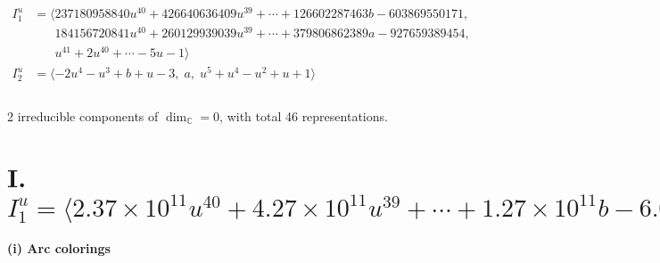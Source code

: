 \documentclass[1p]{elsarticle_modified}
\theoremstyle{definition}
\begin{document}
\begin{align*}
I^u_{1}&=\langle 
237180958840 u^{40}+426640636409 u^{39}+\cdots+126602287463 b-603869550171,\\
\phantom{I^u_{1}}&\phantom{= \langle  }184156720841 u^{40}+260129939039 u^{39}+\cdots+379806862389 a-927659389454,\\
\phantom{I^u_{1}}&\phantom{= \langle  }u^{41}+2 u^{40}+\cdots-5 u-1\rangle \\
I^u_{2}&=\langle 
-2 u^4- u^3+b+u-3,\;a,\;u^5+u^4- u^2+u+1\rangle \\
\\
\end{align*}
\raggedright * 2 irreducible components of $\dim_{\mathbb{C}}=0$, with total 46 representations.\\
\newpage
\renewcommand{\arraystretch}{1}
\centering \section*{I. $I^u_{1}= \langle 2.37\times10^{11} u^{40}+4.27\times10^{11} u^{39}+\cdots+1.27\times10^{11} b-6.04\times10^{11},\;1.84\times10^{11} u^{40}+2.60\times10^{11} u^{39}+\cdots+3.80\times10^{11} a-9.28\times10^{11},\;u^{41}+2 u^{40}+\cdots-5 u-1 \rangle$}
\flushleft \textbf{(i) Arc colorings}\\
\end{document}

